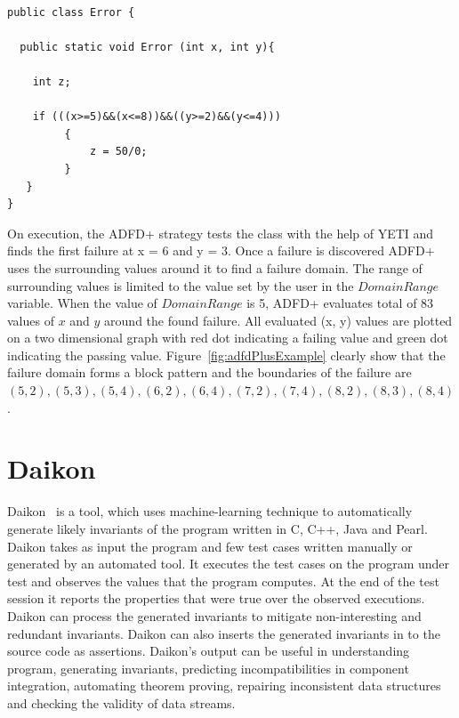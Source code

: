 \documentclass{acm_proc_article-sp}
\begin{document}
\begin{lstlisting}

public class Error {

  public static void Error (int x, int y){

    int z;

    if (((x>=5)&&(x<=8))&&((y>=2)&&(y<=4)))
		 {
			 z = 50/0;
		 }
   } 
}
\end{lstlisting}

On execution, the ADFD+ strategy tests the class with the help of YETI and finds the first failure at x = 6 and y = 3. Once a failure is discovered ADFD+ uses the surrounding values around it to find a failure domain. The range of surrounding values is limited to the value set by the user in the $Domain Range$ variable. When the value of $Domain Range$ is 5, ADFD+ evaluates total of 83 values of $x$ and $y$ around the found failure. All evaluated (x, y) values are plotted on a two dimensional graph with red dot indicating a failing value and green dot indicating the passing value. Figure~\ref{fig:adfdPlusExample} clearly show that the failure domain forms a block pattern and the boundaries of the failure are $(5, 2), (5, 3),(5, 4), (6, 2), (6, 4), (7, 2), (7, 4), (8, 2), (8, 3), (8, 4)$.






\section{Daikon}
Daikon~\cite{ernst2007daikon} is a tool, which uses machine-learning technique to automatically generate likely invariants of the program written in C, C++, Java and Pearl. Daikon takes as input the program and few test cases written manually or generated by an automated tool. It executes the test cases on the program under test and observes the values that the program computes. At the end of the test session it reports the properties that were true over the observed executions. Daikon can process the generated invariants to mitigate non-interesting and redundant invariants. Daikon can also inserts the generated invariants in to the source code as assertions. Daikon's output can be useful in understanding program, generating invariants, predicting incompatibilities in component integration, automating theorem proving, repairing inconsistent data structures and checking the validity of data streams.
\end{document}
